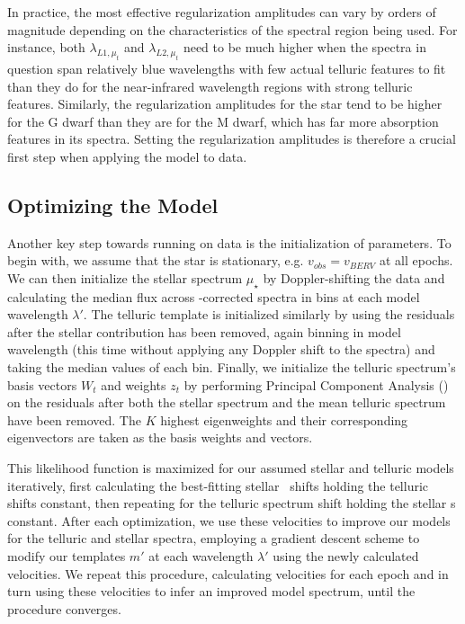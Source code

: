 \documentclass[modern]{aastex62}
\begin{document}
In practice, the most effective regularization amplitudes can vary by orders of magnitude depending on the characteristics of the spectral region being used. 
For instance, both $\lambda_{L1, \mu_{t}}$ and $\lambda_{L2, \mu_{t}}$ need to be much higher when the spectra in question span relatively blue wavelengths with few actual telluric features to fit than they do for the near-infrared wavelength regions with strong telluric features. 
Similarly, the regularization amplitudes for the star tend to be higher for the G dwarf than they are for the M dwarf, which has far more absorption features in its spectra. 
Setting the regularization amplitudes is therefore a crucial first step when applying the \wobble model to data.


\subsection{Optimizing the Model}

Another key step towards running \wobble on data is the initialization of parameters. 
To begin with, we assume that the star is stationary, e.g. $v_{obs} = v_{BERV}$ at all epochs. 
We can then initialize the stellar spectrum $\mu_{\star}$ by Doppler-shifting the data and calculating the median flux across \BERV-corrected spectra in bins at each model wavelength $\lambda'$. 
The telluric template is initialized similarly by using the residuals after the stellar contribution has been removed, again binning in model wavelength (this time without applying any Doppler shift to the spectra) and taking the median values of each bin. 
Finally, we initialize the telluric spectrum's basis vectors $W_t$ and weights $z_t$ by performing Principal Component Analysis () on the residuals after both the stellar spectrum and the mean telluric spectrum have been removed. 
The $K$ highest eigenweights and their corresponding eigenvectors are taken as the basis weights and vectors. 

This likelihood function is maximized for our assumed stellar and telluric models iteratively, first calculating the best-fitting stellar \RV\ shifts holding the telluric shifts constant, then repeating for the telluric spectrum shift holding the stellar \RV s constant.
After each optimization, we use these velocities to improve our models for the telluric and stellar spectra, employing a gradient descent scheme to modify our templates $m'$ at each wavelength $\lambda'$ using the newly calculated velocities.
We repeat this procedure, calculating velocities for each epoch and in turn using these velocities to infer an improved model spectrum, until the procedure converges. 
\end{document}
